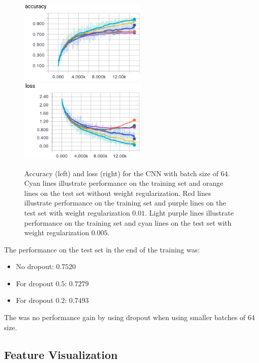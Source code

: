 \documentclass{article}
\begin{document}
\begin{figure}[h!]
\centering
\includegraphics[height=4.0cm]{acc-linear-64-drop.png}\
\includegraphics[height=4.0cm]{loss-linear-64-drop.png}
\caption{Accuracy (left) and loss (right) for the CNN with batch size of $64$. Cyan lines illustrate performance on the training set and orange lines on the test set without weight regularization. Red lines illustrate performance on the training set and purple lines on the test set with weight regularization $0.01$. Light purple lines illustrate performance on the training set and cyan lines on the test set with weight regularization $0.005$.}
\label{fig:6}
\end{figure}

The performance on the test set in the end of the training was:
\begin{itemize}
\item No dropout: $0.7520$
\item For dropout $0.5$: $0.7279$
\item For dropout $0.2$: $0.7493$
\end{itemize}
The was no performance gain by using dropout when using smaller batches of $64$ size.


\subsection{Feature Visualization}
\label{sec:vis}
\end{document}
